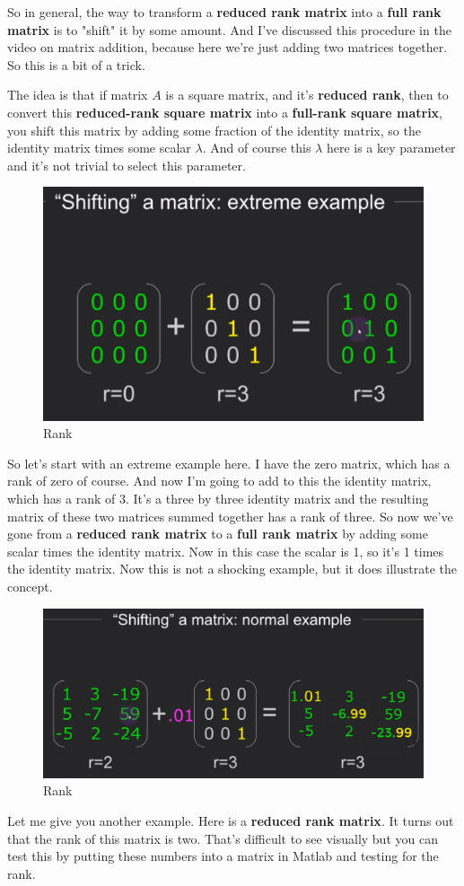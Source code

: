 \documentclass[fleqn,10pt]{olplainarticle}
\theoremstyle{definition}
\theoremstyle{remark}
\begin{document}
So in general, the way to transform a \textbf{reduced rank matrix} into a \textbf{full rank matrix} is to "shift" it by some amount. And I've discussed this procedure in the video on matrix addition, because here we're just adding two matrices together. So this is a bit of a trick.

The idea is that if matrix $A$ is a square matrix, and it's \textbf{reduced rank}, then to convert this \textbf{reduced-rank square matrix} into a \textbf{full-rank square matrix}, you shift this matrix by adding some fraction of the identity matrix, so the identity matrix times some scalar $\lambda$. And of course this $\lambda$ here is a key parameter and it's not trivial to select this parameter. 

\begin{figure}[ht]
	\centering
	\includegraphics[width=0.3\linewidth]{images/rank-30.png}
	\caption{Rank}
	\label{fig:rank_30}
\end{figure}

So let's start with an extreme example here. I have the zero matrix, which has a rank of zero of course. And now I'm going to add to this the identity matrix, which has a rank of 3. It's a three by three identity matrix and the resulting matrix of these two matrices summed together has a rank of three. So now we've gone from a \textbf{reduced rank matrix} to a \textbf{full rank matrix} by adding some scalar times the identity matrix. Now in this case the scalar is 1, so it's 1 times the identity matrix. Now this is not a shocking example, but it does illustrate the concept.

\begin{figure}[ht]
	\centering
	\includegraphics[width=0.5\linewidth]{images/rank-31.png}
	\caption{Rank}
	\label{fig:rank_31}
\end{figure}

Let me give you another example. Here is a \textbf{reduced rank matrix}. It turns out that the rank of this matrix is two. That's difficult to see visually but you can test this by putting these numbers into a matrix in Matlab and testing for the rank.
\end{document}
